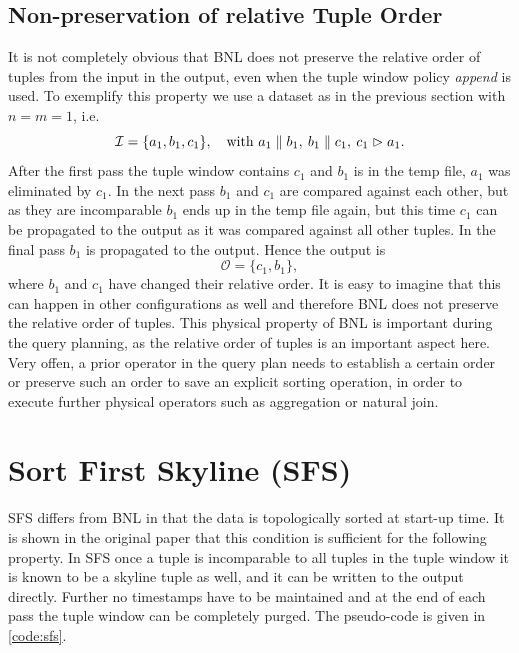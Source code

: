 \subsection{Non-preservation of relative Tuple Order}
\label{sec:bnl-tuple-order}
It is not completely obvious that BNL does not preserve the relative
order of tuples from the input in the output, even when the tuple
window policy \emph{append} is used.  To exemplify this property
we use a dataset as in the previous section with $n=m=1$, i.e.
\[
\mathcal{I} = \{a_1, b_1, c_1\},\quad\text{with}\ a_1 \parallel b_1,\: b_1 \parallel c_1,\: c_1 \vartriangleright a_1.
\]
After the first pass the tuple window contains $c_1$ and $b_1$ is in
the temp file, $a_1$ was eliminated by $c_1$. In the next pass $b_1$
and $c_1$ are compared against each other, but as they are incomparable
$b_1$ ends up in the temp file again, but this time $c_1$ can be
propagated to the output as it was compared against all other tuples.
In the final pass $b_1$ is propagated to the output.  Hence the output
is
\[
\mathcal{O} = \{c_1, b_1\}, 
\]
where $b_1$ and $c_1$ have changed their relative order.  It is easy
to imagine that this can happen in other configurations as well and
therefore BNL does not preserve the relative order of tuples.  This
physical property of BNL is important during the query planning, as the
relative order of tuples is an important aspect here. Very offen, a prior
operator in the query plan needs to establish a certain order or preserve such an order
to save an explicit sorting operation, in order to execute further 
physical operators such as aggregation or natural join.

\section{Sort First Skyline (SFS)}
SFS \citep{Chomicki2003} differs from BNL in that the data is
topologically sorted at start-up time.  It is shown in the original
paper that this condition is sufficient for the following property.  In
SFS once a tuple is incomparable to all tuples in the tuple window it
is known to be a skyline tuple as well, and it can be written to the
output directly.  Further no timestamps have to be maintained and at
the end of each pass the tuple window can be completely purged.
The pseudo-code is given in \autoref{code:sfs}.


